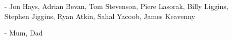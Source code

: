 \clearpage


\begin{acknowledgements}
\begin{itemize}
\item[-] Jon Hays, Adrian Bevan, Tom Stevenson, Piere Lasorak, Billy Liggins, Stephen Jiggins, Ryan Atkin, Sahal Yacoob, James Keavenny
\item[-] Mum, Dad
\end{itemize}
\end{acknowledgements}

\clearpage